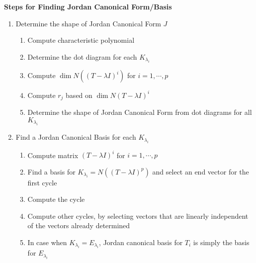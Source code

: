 \documentclass[11pt]{article}
\begin{document}
\begin{defn*}
    \textbf{Steps for Finding Jordan Canonical Form/Basis} \\
    \begin{enumerate}
        \item Determine the shape of Jordan Canonical Form $J$
        \begin{enumerate}
            \item Compute characteristic polynomial 
            \item Determine the dot diagram for each $K_{\lambda_i}$
            \item Compute $\dim{N((T-\lambda I)^i)}$ for $i=1,\cdots, p$
            \item Compute $r_j$ based on $\dim{N(T-\lambda I)^i}$
            \item Determine the shape of Jordan Canonical Form from dot diagrams for all $K_{\lambda_i}$    
        \end{enumerate}
        \item Find a Jordan Canonical Basis for each $K_{\lambda_i}$
        \begin{enumerate}
            \item Compute matrix $(T-\lambda I)^i$ for $i=1,\cdots,p$ 
            \item Find a basis for $K_{\lambda_i} = N((T-\lambda I)^p)$ and select an end vector for the first cycle 
            \item Compute the cycle
            \item Compute other cycles, by selecting vectors that are linearly independent of the vectors already determined
            \item In case when $K_{\lambda_i} = E_{\lambda_i}$, Jordan canonical basis for $T_i$ is simply the basis for $E_{\lambda_i}$
        \end{enumerate}
    \end{enumerate}
\end{defn*}
\end{document}
